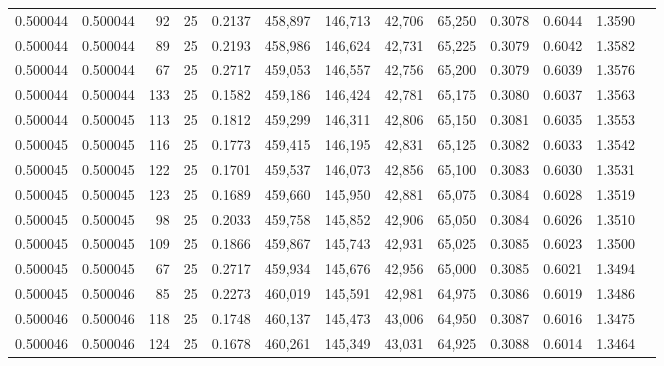 \begin{tabular}{rrrrrrrrrrrrr}
0.500044 & 0.500044 &    92 &  25 &                                     0.2137 & 458,897 & 146,713 &  42,706 &  65,250 & 0.3078 & 0.6044 & 1.3590 \\
0.500044 & 0.500044 &    89 &  25 &                                     0.2193 & 458,986 & 146,624 &  42,731 &  65,225 & 0.3079 & 0.6042 & 1.3582 \\
0.500044 & 0.500044 &    67 &  25 &                                     0.2717 & 459,053 & 146,557 &  42,756 &  65,200 & 0.3079 & 0.6039 & 1.3576 \\
0.500044 & 0.500044 &   133 &  25 &                                     0.1582 & 459,186 & 146,424 &  42,781 &  65,175 & 0.3080 & 0.6037 & 1.3563 \\
0.500044 & 0.500045 &   113 &  25 &                                     0.1812 & 459,299 & 146,311 &  42,806 &  65,150 & 0.3081 & 0.6035 & 1.3553 \\
0.500045 & 0.500045 &   116 &  25 &                                     0.1773 & 459,415 & 146,195 &  42,831 &  65,125 & 0.3082 & 0.6033 & 1.3542 \\
0.500045 & 0.500045 &   122 &  25 &                                     0.1701 & 459,537 & 146,073 &  42,856 &  65,100 & 0.3083 & 0.6030 & 1.3531 \\
0.500045 & 0.500045 &   123 &  25 &                                     0.1689 & 459,660 & 145,950 &  42,881 &  65,075 & 0.3084 & 0.6028 & 1.3519 \\
0.500045 & 0.500045 &    98 &  25 &                                     0.2033 & 459,758 & 145,852 &  42,906 &  65,050 & 0.3084 & 0.6026 & 1.3510 \\
0.500045 & 0.500045 &   109 &  25 &                                     0.1866 & 459,867 & 145,743 &  42,931 &  65,025 & 0.3085 & 0.6023 & 1.3500 \\
0.500045 & 0.500045 &    67 &  25 &                                     0.2717 & 459,934 & 145,676 &  42,956 &  65,000 & 0.3085 & 0.6021 & 1.3494 \\
0.500045 & 0.500046 &    85 &  25 &                                     0.2273 & 460,019 & 145,591 &  42,981 &  64,975 & 0.3086 & 0.6019 & 1.3486 \\
0.500046 & 0.500046 &   118 &  25 &                                     0.1748 & 460,137 & 145,473 &  43,006 &  64,950 & 0.3087 & 0.6016 & 1.3475 \\
0.500046 & 0.500046 &   124 &  25 &                                     0.1678 & 460,261 & 145,349 &  43,031 &  64,925 & 0.3088 & 0.6014 & 1.3464 \\

\end{tabular}
